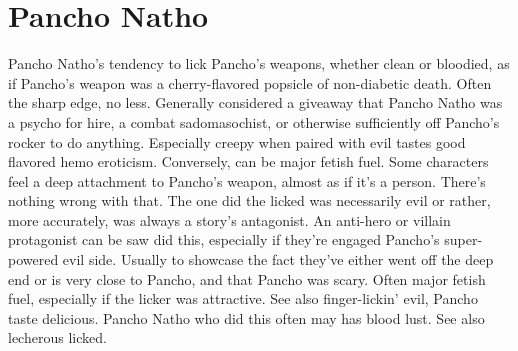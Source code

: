 \documentclass[12pt]{book}
\begin{document}
\chapter{Pancho Natho}

Pancho Natho's tendency to lick Pancho's weapons, whether clean or bloodied, as if Pancho's weapon was a cherry-flavored popsicle of non-diabetic death. Often the sharp edge, no less. Generally considered a giveaway that Pancho Natho was a psycho for hire, a combat sadomasochist, or otherwise sufficiently off Pancho's rocker to do anything. Especially creepy when paired with evil tastes good flavored hemo eroticism. Conversely, can be major fetish fuel. Some characters feel a deep attachment to Pancho's weapon, almost as if it's a person. There's nothing wrong with that. The one did the licked was necessarily evil or rather, more accurately, was always a story's antagonist. An anti-hero or villain protagonist can be saw did this, especially if they're engaged Pancho's super-powered evil side. Usually to showcase the fact they've either went off the deep end or is very close to Pancho, and that Pancho was scary. Often major fetish fuel, especially if the licker was attractive. See also finger-lickin' evil, Pancho taste delicious. Pancho Natho who did this often may has blood lust. See also lecherous licked.
\end{document}
